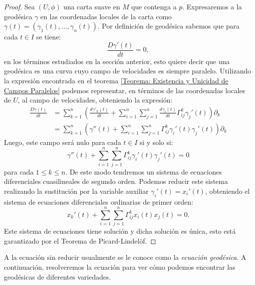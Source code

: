 \begin{proof}
	Sea $(U,\phi)$ una carta suave en $M$ que contenga a $p$. Expresaremos a la geodésica $\gamma$ en las coordenadas locales de la carta como $\gamma(t) = (\gamma_{1}(t), \ldots, \gamma_{n}(t))$. Por definición de geodésica sabemos que para cada $t \in I$ se tiene:
	\[
		\frac{D \gamma'(t)}{dt} = 0,
	\]
	en los términos estudiados en la sección anterior, esto quiere decir que una geodésica es una curva cuyo campo de velocidades es siempre paralelo. Utilizando la expresión encontrada en el teorema \ref{Teorema: Existencia y Unicidad de Campos Paralelos} podemos representar, en términos de las coordenadas locales de $U$, al campo de velocidades, obteniendo la expresión:
	\begin{align*}
		\frac{D\gamma(t)}{dt} & = \sum_{k=1}^{n} \left(
		\frac{d\gamma'_k(t)}{dt} + \sum_{i=1}^{n}\sum_{j=1}^{n} \frac{d\gamma_{i}(t)}{dt} \Gamma_{ij}^{k}\gamma_{j}'(t)
		\right) \partial_{k}                                                                                                                    \\
		                      & = \sum_{k=1}^{n} \left( \gamma''(t) + \sum_{i=1}^{n}\sum_{j=1}^{n} \Gamma_{ij}^{k} \gamma_{i}'(t)\gamma_{j}'(t)
		\right)\partial_{k}
	\end{align*}
	Luego, este campo será nulo para cada $t \in I$ si y solo si:
	\[
		\gamma''(t) + \sum_{i=1}^{n}\sum_{j=1}^{n} \Gamma_{ij}^{k}\gamma_{i}'(t) \gamma_{j}'(t) = 0
	\]
	para cada $1 \leq k \leq n$. De este modo tendremos un sistema de ecuaciones diferenciales cuasilineales de segundo orden. Podemos reducir este sistema realizando la sustitución por la variable auxiliar $\gamma_{i}'(t) = x_{i}'(t)$, obteniendo el sistema de ecuaciones diferenciales ordinarias de primer orden:
	\[
		x_{k}'(t) + \sum_{i=1}^{n} \sum_{j=1}^{n} \Gamma_{ij}^{k} x_{i}(t) x_{j}(t) = 0.
	\]
	Este sistema de ecuaciones tiene solución y dicha solución es única, esto está garantizado por el Teorema de Picard-Lindelöf.
\end{proof}

A la ecuación sin reducir usualmente se le conoce como la \textit{ecuación geodésica}. A continuación, resolveremos la ecuación para ver cómo podemos encontrar las geodésicas de diferentes variedades.
